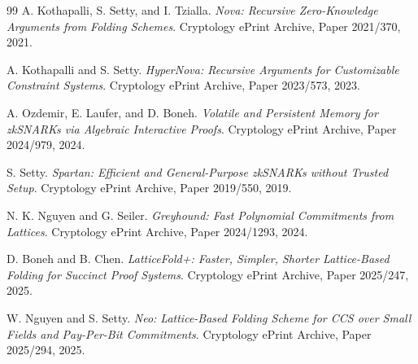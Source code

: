 \documentclass[10pt,a4paper]{article}
\begin{document}
\begin{thebibliography}{99}
	A. Kothapalli, S. Setty, and I. Tzialla.
	\newblock \emph{Nova: Recursive Zero-Knowledge Arguments from Folding Schemes}.
	\newblock Cryptology ePrint Archive, Paper 2021/370, 2021.

	A. Kothapalli and S. Setty.
	\newblock \emph{HyperNova: Recursive Arguments for Customizable Constraint Systems}.
	\newblock Cryptology ePrint Archive, Paper 2023/573, 2023.

	A. Ozdemir, E. Laufer, and D. Boneh.
	\newblock \emph{Volatile and Persistent Memory for zkSNARKs via Algebraic Interactive Proofs}.
	\newblock Cryptology ePrint Archive, Paper 2024/979, 2024.

	S. Setty.
	\newblock \emph{Spartan: Efficient and General-Purpose zkSNARKs without Trusted Setup}.
	\newblock Cryptology ePrint Archive, Paper 2019/550, 2019.

	N. K. Nguyen and G. Seiler.
	\newblock \emph{Greyhound: Fast Polynomial Commitments from Lattices}.
	\newblock Cryptology ePrint Archive, Paper 2024/1293, 2024.

	D. Boneh and B. Chen.
	\newblock \emph{LatticeFold+: Faster, Simpler, Shorter Lattice-Based Folding for Succinct Proof Systems}.
	\newblock Cryptology ePrint Archive, Paper 2025/247, 2025.

	W. Nguyen and S. Setty.
	\newblock \emph{Neo: Lattice-Based Folding Scheme for CCS over Small Fields and Pay-Per-Bit Commitments}.
	\newblock Cryptology ePrint Archive, Paper 2025/294, 2025.

\end{thebibliography}
\end{document}
